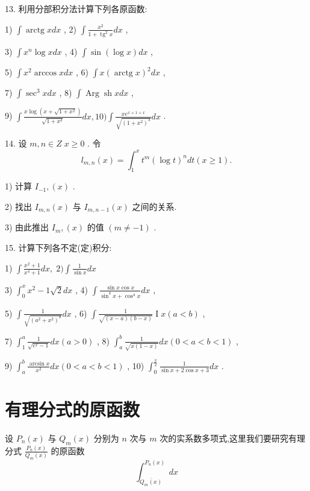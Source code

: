13. 利用分部积分法计算下列各原函数:

1) $\int \operatorname{arctg}{xdx}$ , 2) $\int \frac{{x}^{2}}{1 + {\operatorname{tg}}^{2}x}{dx}$ ,

3) $\int {x}^{n}\log {xdx}$ , 4) $\int \sin \left( {\log x}\right) {dx}$ ,

5) $\int {x}^{2}\arccos {xdx}$ , 6) $\int x{\left( \operatorname{arctg}x\right) }^{2}{dx}$ ,

7) $\int {\sec }^{3}{xdx}$ , 8) $\int \operatorname{Arg}\operatorname{sh}{xdx}$ ,

9) $\int \frac{x\log \left( {x + \sqrt{1 + {x}^{2}}}\right) }{\sqrt{1 + {x}^{2}}}{dx},{10})\int \frac{x{e}^{x + 1 + x}}{\sqrt{{\left( 1 + {x}^{2}\right) }^{3}}}{dx}$ .

14. 设 $m,n \in  Z\;x \geq  0$ . 令
$${l}_{m,n}\left( x\right)  = {\int }_{1}^{x}{t}^{m}{\left( \log t\right) }^{n}{dt}\left( {x \geq  1}\right) .$$

1) 计算 ${I}_{-1},\left( x\right)$ .

2) 找出 ${I}_{m,n}\left( x\right)$ 与 ${I}_{m,n - 1}\left( x\right)$ 之间的关系.

3) 由此推出 ${I}_{m},\left( x\right)$ 的值 $\left( {m \neq   - 1}\right)$ .

15. 计算下列各不定(定)积分:

1) $\int \frac{{x}^{2} + 1}{{x}^{4} + 1}{dx},\;2)\int \frac{1}{\sin x}{dx}$

3) ${\int }_{0}^{x}{x}^{2} - 1\sqrt{2}{dx}$ , 4) $\int \frac{\sin x\cos x}{{\sin }^{4}x + {\cos }^{4}x}{dx}$ ,

5) $\int \frac{1}{\sqrt{{\left( {a}^{2} + {x}^{2}\right) }^{8}}}{dx}$ , 6) $\int \frac{1}{\sqrt{\left( {x - a}\right) \left( {b - x}\right) }}\operatorname{I}x\left( {a < b}\right)$ ,

7) ${\int }_{1}^{a}\frac{1}{\sqrt{{e}^{x} - 1}}{dx}\left( {a > 0}\right)$ , 8) ${\int }_{a}^{b}\frac{1}{\sqrt{x\left( {1 - x}\right) }}{dx}\left( {0 < a < b < 1}\right)$ ,

9) ${\int }_{a}^{b}\frac{\arcsin x}{{x}^{2}}{dx}\left( {0 < a < b < 1}\right)$ , 10) ${\int }_{0}^{\frac{\pi }{2}}\frac{1}{\sin x + 2\cos x + 3}{dx}$ .

\section{有理分式的原函数}

设 ${P}_{n}\left( x\right)$ 与 ${Q}_{m}\left( x\right)$ 分别为 $n$ 次与 $m$ 次的实系数多项式,这里我们要研究有理分式 $\frac{{P}_{n}\left( x\right) }{{Q}_{m}\left( x\right) }$ 的原函数
$${\int }_{\overline{{Q}_{m}\left( x\right) }}^{{P}_{n}\left( x\right) }{dx}$$

